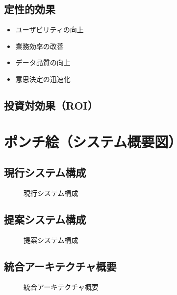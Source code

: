 \documentclass[12pt,a4paper]{jsarticle}
\begin{document}
\subsection{定性的効果}
\begin{itemize}
    \item ユーザビリティの向上
    \item 業務効率の改善
    \item データ品質の向上
    \item 意思決定の迅速化
\end{itemize}

\subsection{投資対効果（ROI）}

\section{ポンチ絵（システム概要図）}

\subsection{現行システム構成}
\begin{figure}[h]
\centering
\caption{現行システム構成}
\end{figure}

\subsection{提案システム構成}
\begin{figure}[h]
\centering
\caption{提案システム構成}
\end{figure}

\subsection{統合アーキテクチャ概要}
\begin{figure}[h]
\centering
\caption{統合アーキテクチャ概要}
\end{figure}
\end{document}
